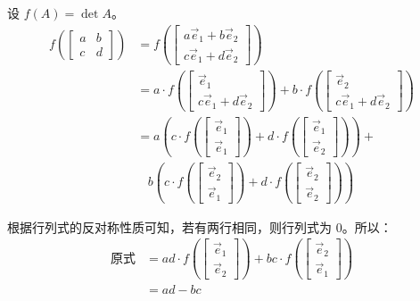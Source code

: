 \begin{solve}
	设 $f(A) = \det A$。
	$$
	\begin{aligned}
		f \left( \begin{bmatrix}a&b\\c&d\end{bmatrix} \right) &= f \left( \begin{bmatrix}a\vec e_1 + b\vec e_2\\c\vec e_1 + d\vec e_2\end{bmatrix} \right)
		\\&= a \cdot f \left( \begin{bmatrix}\vec e_1\\c\vec e_1 + d\vec e_2\end{bmatrix} \right) + b \cdot f \left( \begin{bmatrix}\vec e_2\\c\vec e_1 + d\vec e_2\end{bmatrix} \right)
		\\&= a\left(c \cdot f \left( \begin{bmatrix}\vec e_1\\\vec e_1\end{bmatrix} \right) +
		d \cdot f \left( \begin{bmatrix}\vec e_1\\\vec e_2\end{bmatrix} \right) \right) +
		\\&~~~~
		b\left(c \cdot f \left( \begin{bmatrix}\vec e_2\\\vec e_1\end{bmatrix} \right) +
		d \cdot f \left( \begin{bmatrix}\vec e_2\\\vec e_2\end{bmatrix} \right) \right)
	\end{aligned}
	$$

	根据行列式的反对称性质可知，若有两行相同，则行列式为 $0$。所以：
	$$
	\begin{aligned}
		\text{原式} &= ad \cdot f(\begin{bmatrix}\vec e_1\\\vec e_2\end{bmatrix}) + bc \cdot f(\begin{bmatrix}\vec e_2\\\vec e_1\end{bmatrix})
		\\&=
		ad - bc
	\end{aligned}
	$$
\end{solve}

